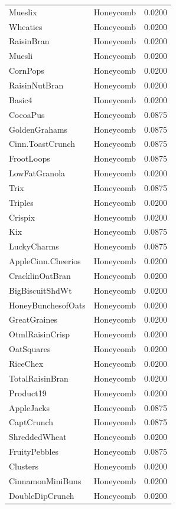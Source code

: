\begin{table}[!htbp]
\begin{tabular}{lll}
\\
Mueslix & Honeycomb & 0.0200
\\
Wheaties & Honeycomb & 0.0200
\\
RaisinBran & Honeycomb & 0.0200
\\
Muesli & Honeycomb & 0.0200
\\
CornPops & Honeycomb & 0.0200
\\
RaisinNutBran & Honeycomb & 0.0200
\\
Basic4 & Honeycomb & 0.0200
\\
CocoaPus & Honeycomb & 0.0875
\\
GoldenGrahams & Honeycomb & 0.0875
\\
Cinn.ToastCrunch & Honeycomb & 0.0875
\\
FrootLoops & Honeycomb & 0.0875
\\
LowFatGranola & Honeycomb & 0.0200
\\
Trix & Honeycomb & 0.0875
\\
Triples & Honeycomb & 0.0200
\\
Crispix & Honeycomb & 0.0200
\\
Kix & Honeycomb & 0.0875
\\
LuckyCharms & Honeycomb & 0.0875
\\
AppleCinn.Cheerios & Honeycomb & 0.0200
\\
CracklinOatBran & Honeycomb & 0.0200
\\
BigBiscuitShdWt & Honeycomb & 0.0200
\\
HoneyBunchesofOats & Honeycomb & 0.0200
\\
GreatGraines & Honeycomb & 0.0200
\\
OtmlRaisinCrisp & Honeycomb & 0.0200
\\
OatSquares & Honeycomb & 0.0200
\\
RiceChex & Honeycomb & 0.0200
\\
TotalRaisinBran & Honeycomb & 0.0200
\\
Product19 & Honeycomb & 0.0200
\\
AppleJacks & Honeycomb & 0.0875
\\
CaptCrunch & Honeycomb & 0.0875
\\
ShreddedWheat & Honeycomb & 0.0200
\\
FruityPebbles & Honeycomb & 0.0875
\\
Clusters & Honeycomb & 0.0200
\\
CinnamonMiniBuns & Honeycomb & 0.0200
\\
DoubleDipCrunch & Honeycomb & 0.0200
\\

\end{tabular}
\end{table}
